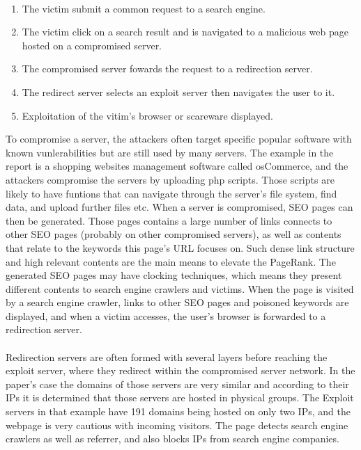 \paragraph{}
\begin{enumerate} 
\item The victim submit a common request to a search engine.
\item The victim click on a search result and is navigated to a malicious web
page hosted on a compromised server.
\item The compromised server fowards the request to a redirection server.
\item The redirect server selects an exploit server then navigates the user
to it.  
\item Exploitation of the vitim's browser or scareware displayed.  
\end{enumerate}

To compromise a server, the attackers often target specific popular software
with known vunlerabilities but are still used by many servers. The example in
the report is a shopping websites management software called osCommerce, and
the attackers compromise the servers by uploading php scripts. Those scripts
are likely to have funtions that can navigate through the server's file system,
find data, and upload further files etc. When a server is compromised, SEO
pages can then be generated. Those pages contains a large number of links
connects to other SEO pages (probably on other compromised servers), as well as
contents that relate to the keywords this page's URL focuses on. Such dense
link structure and high relevant contents are the main means to elevate the
PageRank. The generated SEO pages may have clocking techniques, which means
they present different contents to search engine crawlers and victims. When the
page is visited by a search engine crawler, links to other SEO pages and
poisoned keywords are displayed, and when a victim accesses, the user's browser
is forwarded to a redirection server. 

\paragraph{}
Redirection servers are often formed
with several layers before reaching the exploit server, where they redirect
within the compromised server network. In the paper's case the domains of those
servers are very similar and according to their IPs it is determined that those
servers are hosted in physical groups. The Exploit servers in that example have
191 domains being hosted on only two IPs, and the webpage is very cautious with
incoming visitors. The page detects search engine crawlers as well as referrer,
and also blocks IPs from search engine companies.  

